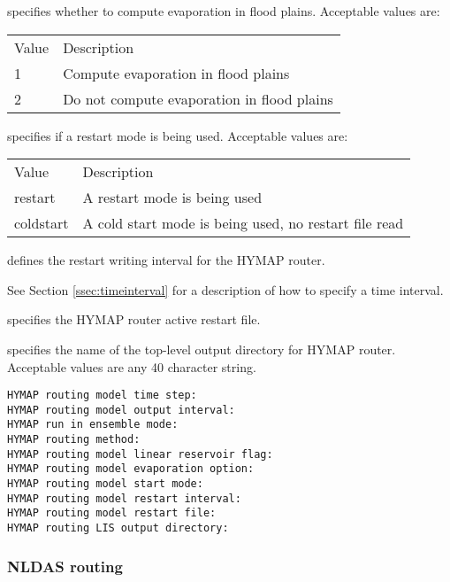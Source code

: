   specifies whether
 to compute evaporation in flood plains.
 Acceptable values are:

 \begin{tabular}{ll}
 Value & Description                                \\
 1     & Compute evaporation in flood plains        \\
 2     & Do not compute evaporation in flood plains \\
 \end{tabular}

  specifies if a restart mode is
 being used. 
 Acceptable values are:

 \begin{tabular}{ll}
 Value     & Description                                           \\
 restart   & A restart mode is being used                          \\
 coldstart & A cold start mode is being used, no restart file read \\
 \end{tabular}

  defines the restart writing 
 interval for the HYMAP router.

 See Section \ref{ssec:timeinterval} for a description
 of how to specify a time interval.

  specifies the HYMAP router
 active restart file.

  specifies the name of the
 top-level output directory for HYMAP router.
 Acceptable values are any 40 character string.
 

 \begin{Verbatim}[frame=single]
HYMAP routing model time step:
HYMAP routing model output interval:
HYMAP run in ensemble mode:
HYMAP routing method:
HYMAP routing model linear reservoir flag:
HYMAP routing model evaporation option:
HYMAP routing model start mode:
HYMAP routing model restart interval:
HYMAP routing model restart file:
HYMAP routing LIS output directory:
 \end{Verbatim}

 
 \subsubsection{NLDAS routing} \label{sssec:nldasrouting}
 

